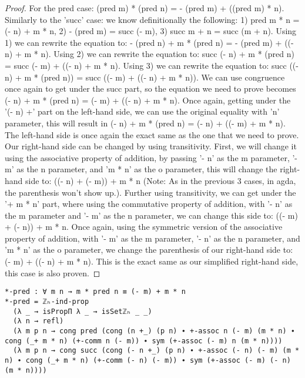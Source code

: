 \begin{proof}
  For the pred case: (pred m) * (pred n) = - (pred m) + ((pred m) * n). Similarly to the 'succ' case: we know definitionally the following: 1) pred m * n = (- n) + m * n, 2) - (pred m) = succ (- m), 3) succ m + n = succ (m + n). Using 1) we can rewrite the equation to: - (pred n) + m * (pred n) = - (pred m) + ((- n) + m * n). Using 2) we can rewrite the equation to: succ (- n) + m * (pred n) = succ (- m) + ((- n) + m * n). Using 3) we can rewrite the equation to: succ ((- n) + m * (pred n)) = succ ((- m) + ((- n) + m * n)). We can use congruence once again to get under the succ part, so the equation we need to prove becomes (- n) + m * (pred n) = (- m) + ((- n) + m * n). Once again, getting under the '(- n) +' part on the left-hand side, we can use the original equality with 'n' parameter, this will result in (- n) + m * (pred n) = (- n) + ((- m) + m * n). The left-hand side is once again the exact same as the one that we need to prove. Our right-hand side can be changed by using transitivity. First, we will change it using the associative property of addition, by passing '- n' as the m parameter, '- m' as the n parameter, and 'm * n' as the o parameter, this will change the right-hand side to: ((- n) + (- m)) + m * n (Note: As in the previous 3 cases, in agda, the parenthesis won't show up.). Further using transitivity, we can get under the '+ m * n' part, where using the commutative property of addition, with '- n' as the m parameter and '- m' as the n parameter, we can change this side to: ((- m) + (- n)) + m * n. Once again, using the symmetric version of the associative property of addition, with '- m' as the m parameter, '- n' as the n parameter, and 'm * n' as the o parameter, we change the parenthesis of our right-hand side to: (- m) + ((- n) + m * n). This is the exact same as our simplified right-hand side, this case is also proven.
\end{proof}

\begin{listing}[H]
\begin{verbatim}
*-pred : ∀ m n → m * pred n ≡ (- m) + m * n
*-pred = ℤₕ-ind-prop
  (λ _ → isPropΠ λ _ → isSetℤₕ _ _)
  (λ n → refl)
  (λ m p n → cong pred (cong (n +_) (p n) ∙ +-assoc n (- m) (m * n) ∙ cong (_+ m * n) (+-comm n (- m)) ∙ sym (+-assoc (- m) n (m * n))))
  (λ m p n → cong succ (cong (- n +_) (p n) ∙ +-assoc (- n) (- m) (m * n) ∙ cong (_+ m * n) (+-comm (- n) (- m)) ∙ sym (+-assoc (- m) (- n) (m * n))))
\end{verbatim}
\caption{Agda proof of pred being destructed by multiplication}
\end{listing}

